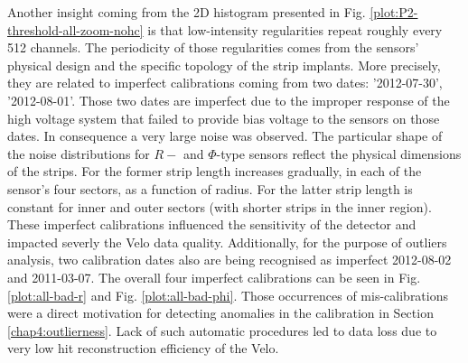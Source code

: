 Another insight coming from the 2D histogram presented in Fig. \ref{plot:P2-threshold-all-zoom-nohc} is that low-intensity regularities repeat roughly every 512 channels. The periodicity of those regularities comes from the sensors' physical design and the specific topology of the strip implants.
More precisely, they are related to imperfect calibrations coming from two dates:  '2012-07-30', '2012-08-01'.
Those two dates are imperfect due to the improper response of the high voltage system that failed to provide bias voltage to the sensors on those dates. In consequence a very large noise was observed. The particular shape of the noise distributions for $R-$ and $\Phi$-type sensors reflect the physical dimensions of the strips. For the former strip length increases gradually, in each of the sensor's four sectors, as a function of radius. For the latter strip length is constant for inner and outer sectors (with shorter strips in the inner region).
These imperfect calibrations influenced the sensitivity of the detector and impacted severly the Velo data quality. 
Additionally, for the purpose of outliers analysis, two calibration dates also are being recognised as imperfect 2012-08-02 and 2011-03-07.
The overall four imperfect calibrations can be seen in Fig. \ref{plot:all-bad-r} and Fig. \ref{plot:all-bad-phi}.
Those occurrences of mis-calibrations were a direct motivation for detecting anomalies in the calibration in Section \ref{chap4:outlierness}. Lack of such automatic procedures led to data loss due to very low hit reconstruction efficiency of the Velo.

